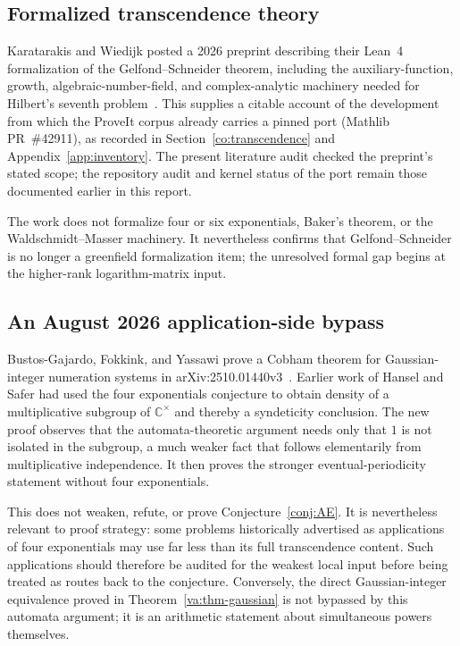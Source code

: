 \documentclass[11pt,oneside]{article}
\theoremstyle{definition}
\theoremstyle{remark}
\newcommand{\C}{\mathbb C}
\begin{document}
\subsection{Formalized transcendence theory}

Karatarakis and Wiedijk posted a 2026 preprint describing their Lean~4 formalization of the
Gelfond--Schneider theorem, including the auxiliary-function, growth,
algebraic-number-field, and complex-analytic machinery needed for Hilbert's seventh
problem~\cite{KaratarakisWiedijk2026}.  This supplies a citable account of the development
from which the ProveIt corpus already carries a pinned port (Mathlib PR~\#42911), as recorded
in Section~\ref{co:transcendence} and Appendix~\ref{app:inventory}.  The present literature
audit checked the preprint's stated scope; the repository audit and kernel status of the port
remain those documented earlier in this report.

The work does not formalize four or six exponentials, Baker's theorem, or the
Waldschmidt--Masser machinery.  It nevertheless confirms that Gelfond--Schneider is no longer
a greenfield formalization item; the unresolved formal gap begins at the higher-rank
logarithm-matrix input.

\subsection{An August 2026 application-side bypass}

Bustos-Gajardo, Fokkink, and Yassawi prove a Cobham theorem for Gaussian-integer
numeration systems in arXiv:2510.01440v3~\cite{BustosGajardoFokkinkYassawi2026}.
Earlier work of Hansel and Safer had used the four exponentials conjecture to obtain density of
a multiplicative subgroup of $\C^\times$ and thereby a syndeticity conclusion.  The new proof
observes that the automata-theoretic argument needs only that $1$ is not isolated in the subgroup,
a much weaker fact that follows elementarily from multiplicative independence.  It then proves
the stronger eventual-periodicity statement without four exponentials.

This does not weaken, refute, or prove Conjecture~\ref{conj:AE}.  It is nevertheless relevant to
proof strategy: some problems historically advertised as applications of four exponentials may
use far less than its full transcendence content.  Such applications should therefore be audited
for the weakest local input before being treated as routes back to the conjecture.  Conversely,
the direct Gaussian-integer equivalence proved in Theorem~\ref{va:thm-gaussian} is not bypassed by
this automata argument; it is an arithmetic statement about simultaneous powers themselves.
\end{document}
